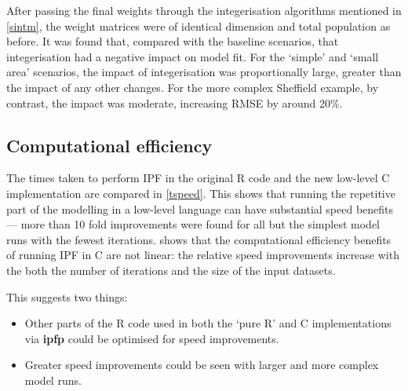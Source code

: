 \documentclass[a4paper,10pt]{article}
\begin{document}
After passing the final weights through the integerisation algorithms mentioned
in \cref{sintm}, the weight matrices were of identical dimension and total population as
before. It was found that, compared with the baseline scenarios, that integerisation
had a negative impact on model fit.
For the `simple' and `small area' scenarios, the impact of integerisation was proportionally
large, greater than the impact of any other changes. For the more complex Sheffield example,
by contrast, the impact was moderate, increasing RMSE by around 20\%.

\subsection{Computational efficiency} \label{sspeedr}

The times taken to perform IPF in the original R code and the new
low-level C implementation are compared in \cref{tspeed}. This shows that running
the repetitive part of the modelling in a low-level language can have
substantial speed benefits --- more than 10 fold improvements were found for
all but the simplest model runs with the fewest iterations.
 shows that the computational efficiency benefits of running IPF in C
are not linear: the relative speed improvements increase with the both the
number of iterations and the size of the input datasets.

This suggests two things:
\begin{itemize}
 \item Other parts of the R code used in both the `pure R' and C implementations via \textbf{ipfp}
 could be optimised for speed improvements.
 \item Greater speed improvements could be seen with larger and more complex model runs.
\end{itemize}

\end{document}
